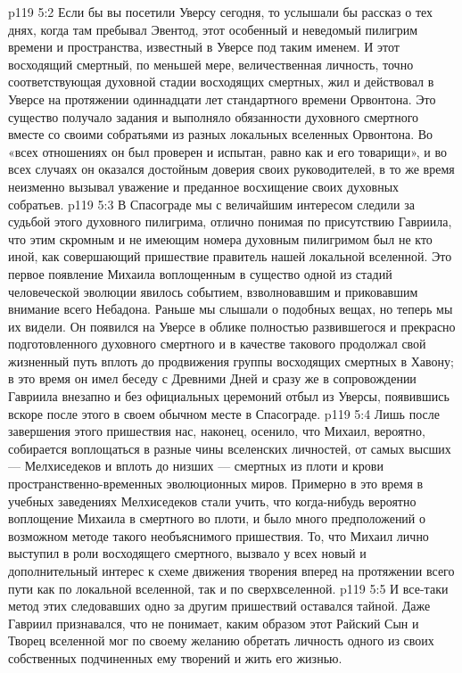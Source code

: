 \vs p119 5:2 Если бы вы посетили Уверсу сегодня, то услышали бы рассказ о тех днях, когда там пребывал Эвентод, этот особенный и неведомый пилигрим времени и пространства, известный в Уверсе под таким именем. И этот восходящий смертный, по меньшей мере, величественная личность, точно соответствующая духовной стадии восходящих смертных, жил и действовал в Уверсе на протяжении одиннадцати лет стандартного времени Орвонтона. Это существо получало задания и выполняло обязанности духовного смертного вместе со своими собратьями из разных локальных вселенных Орвонтона. Во «всех отношениях он был проверен и испытан, равно как и его товарищи», и во всех случаях он оказался достойным доверия своих руководителей, в то же время неизменно вызывал уважение и преданное восхищение своих духовных собратьев.
\vs p119 5:3 В Спасограде мы с величайшим интересом следили за судьбой этого духовного пилигрима, отлично понимая по присутствию Гавриила, что этим скромным и не имеющим номера духовным пилигримом был не кто иной, как совершающий пришествие правитель нашей локальной вселенной. Это первое появление Михаила воплощенным в существо одной из стадий человеческой эволюции явилось событием, взволновавшим и приковавшим внимание всего Небадона. Раньше мы слышали о подобных вещах, но теперь мы их видели. Он появился на Уверсе в облике полностью развившегося и прекрасно подготовленного духовного смертного и в качестве такового продолжал свой жизненный путь вплоть до продвижения группы восходящих смертных в Хавону; в это время он имел беседу с Древними Дней и сразу же в сопровождении Гавриила внезапно и без официальных церемоний отбыл из Уверсы, появившись вскоре после этого в своем обычном месте в Спасограде.
\vs p119 5:4 \pc Лишь после завершения этого пришествия нас, наконец, осенило, что Михаил, вероятно, собирается воплощаться в разные чины вселенских личностей, от самых высших --- Мелхиседеков и вплоть до низших --- смертных из плоти и крови пространственно\hyp{}временных эволюционных миров. Примерно в это время в учебных заведениях Мелхиседеков стали учить, что когда\hyp{}нибудь вероятно воплощение Михаила в смертного во плоти, и было много предположений о возможном методе такого необъяснимого пришествия. То, что Михаил лично выступил в роли восходящего смертного, вызвало у всех новый и дополнительный интерес к схеме движения творения вперед на протяжении всего пути как по локальной вселенной, так и по сверхвселенной.
\vs p119 5:5 И все\hyp{}таки метод этих следовавших одно за другим пришествий оставался тайной. Даже Гавриил признавался, что не понимает, каким образом этот Райский Сын и Творец вселенной мог по своему желанию обретать личность одного из своих собственных подчиненных ему творений и жить его жизнью.
